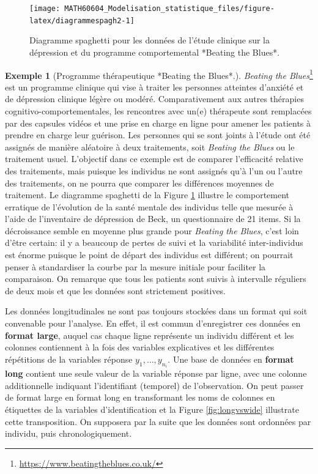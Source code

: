 \documentclass[
  11pt,
  letterpaper,
]{article}
\renewcommand{\href}[2]{#2\footnote{\url{#1}}}
\theoremstyle{definition}
\theoremstyle{definition}
\newtheorem{example}{Exemple}[section]
\theoremstyle{definition}
\theoremstyle{definition}
\theoremstyle{remark}
\begin{document}
\begin{figure}

{\centering \texttt{[image: MATH60604\_Modelisation\_statistique\_files/figure-latex/diagrammespagh2-1]} 

}

\caption{Diagramme spaghetti  pour les données de l'étude clinique sur la dépression et du programme comportemental *Beating the Blues*.}\label{fig:diagrammespagh2}
\end{figure}

\begin{example}[Programme thérapeutique *Beating the Blues*.]
\protect\hypertarget{exm:beatingtheblues}{}\label{exm:beatingtheblues}\href{https://www.beatingtheblues.co.uk/}{\emph{Beating the Blues}} est un programme clinique qui vise à traiter les personnes atteintes d'anxiété et de dépression clinique légère ou modéré. Comparativement aux autres thérapies cognitivo-comportementales, les rencontres avec un(e) thérapeute sont remplacées par des capsules vidéos et une prise en charge en ligne pour amener les patients à prendre en charge leur guérison. Les personnes qui se sont joints à l'étude ont été assignés de manière aléatoire à deux traitements, soit \emph{Beating the Blues} ou le traitement usuel. L'objectif dans ce exemple est de comparer l'efficacité relative des traitements, mais puisque les individus ne sont assignés qu'à l'un ou l'autre des traitements, on ne pourra que comparer les différences moyennes de traitement. Le diagramme spaghetti de la Figure \ref{fig:diagrammespagh2} illustre le comportement erratique de l'évolution de la santé mentale des individus telle que mesurée à l'aide de l'inventaire de dépression de Beck, un questionnaire de 21 items. Si la décroissance semble en moyenne plus grande pour \emph{Beating the Blues}, c'est loin d'être certain: il y a beaucoup de pertes de suivi et la variabilité inter-individus est énorme puisque le point de départ des individus est différent; on pourrait penser à standardiser la courbe par la mesure initiale pour faciliter la comparaison. On remarque que tous les patients sont suivis à intervalle réguliers de deux mois et que les données sont strictement positives.
\end{example}

Les données longitudinales ne sont pas toujours stockées dans un format qui soit convenable pour l'analyse. En effet, il est commun d'enregistrer ces données en \textbf{format large}, auquel cas chaque ligne représente un individu différent et les colonnes contiennent à la fois des variables explicatives et les différentes répétitions de la variables réponse \(y_1, \ldots, y_{n_i}\).
Une base de données en \textbf{format long} contient une seule valeur de la variable réponse par ligne, avec une colonne additionnelle indiquant l'identifiant (temporel) de l'observation. On peut passer de format large en format long en transformant les noms de colonnes en étiquettes de la variables d'identification et la Figure \ref{fig:longvswide} illustrate cette transposition. On supposera par la suite que les données sont ordonnées par individu, puis chronologiquement.
\end{document}
